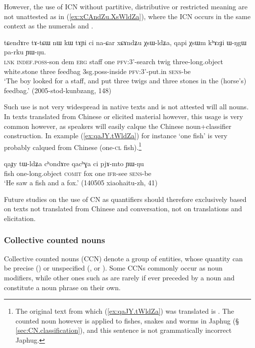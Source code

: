 However, the use of ICN without partitive, distributive or restricted meaning are not unattested as in  (\ref{ex:xCAndZu.XsWldZa}), where the ICN  occurs in the same context as the numerals  and .

\begin{exe}
\ex \label{ex:xCAndZu.XsWldZa}
\gll tɕendɤre tɤ-tɕɯ nɯ kɯ tɤɲi ci na-ɕar xɕɤndʑu χsɯ-ldʑa, qapi χsɯm kʰɤzɟi ɯ-ŋgɯ pa-rku ɲɯ-ŋu. \\
\textsc{lnk} \textsc{indef}.\textsc{poss}-son dem \textsc{erg} staff one \textsc{pfv}:3'-search twig three-long.object white.stone three feedbag 3sg.poss-inside \textsc{pfv}:3'-put.in \textsc{sens}-be \\
\glt `The boy looked for a staff, and put three twigs and three stones in the (horse's) feedbag.' (2005-stod-kunbzang, 148)
\end{exe} 

Such use is not very widespread in native texts and is not attested will all nouns. In texts translated from Chinese or elicited material however, this usage is very common however, as speakers will easily calque the Chinese noun+classifier construction. In example (\ref{ex:qaJY.tWldZa}) for instance  `one fish' is very probably calqued from Chinese   (one-\textsc{cl} fish).\footnote{The original text from which (\ref{ex:qaJY.tWldZa}) was translated is . The counted noun  however is applied to fishes, snakes and worms in Japhug (§ \ref{sec:CN.classification}), and this sentence is not grammatically incorrect Japhug. } 

\begin{exe}
\ex \label{ex:qaJY.tWldZa}
\gll qaɟy tɯ-ldʑa cʰondɤre qacʰɣa ci pjɤ-mto ɲɯ-ŋu \\
fish one-long.object \textsc{comit} fox one \textsc{ifr}-see \textsc{sens}-be \\
\glt `He saw a fish and a fox.' (140505 xiaohaitu-zh, 41)
\end{exe} 

Future studies on the use of CN as quantifiers should therefore exclusively based on texts not translated from Chinese and conversation, not on translations and elicitation.

\subsubsection{Collective counted nouns} \label{sec:CCN}
Collective counted nouns (CCN) denote a group of entities, whose quantity can be precise () or unspecified (,  or ). Some CCNs commonly occur as noun modifiers, while other ones such as  are rarely if ever preceded by a noun and constitute a noun phrase on their own.

